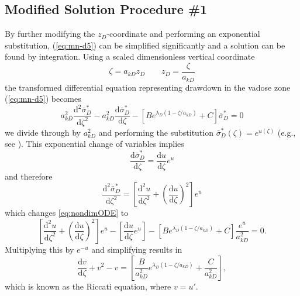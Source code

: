 \documentclass[12pt,letterpaper]{article}
\begin{document}
\subsection{Modified Solution Procedure \#1} 
By further modifying the $z_D$-coordinate and performing an exponential substitution, (\ref{eq:mn-d5}) can be simplified significantly and a solution can be found by integration.  Using a scaled dimensionless vertical coordinate 
\begin{equation}\nonumber
 \zeta= a_{kD} z_D \qquad z_D=\frac{\zeta}{a_{kD}} 
\end{equation}
the transformed differential equation representing drawdown in the vadose zone (\ref{eq:mn-d5}) becomes
\begin{equation}
  \label{eq:nondimODE}
  a_{kD}^2 \frac{\mathrm{d}^2
    \bar{\sigma}_D^{\ast}}{\mathrm{d}\zeta^2} - a_{kD}^2
  \frac{\mathrm{d} \bar{\sigma}_D^{\ast}}{\mathrm{d}\zeta} - \left[
    B e^{\lambda_D (1-\zeta/a_{kD})} + C\right] \bar{\sigma}_D^{\ast}=0
\end{equation}
we divide through by $a_{kD}^2$ and performing the substitution
$\bar{\sigma}_D^{\ast}(\zeta)=e^{u(\zeta)}$ (e.g., see \cite[p.\ 27]{bender1978advanced}).  This exponential change of variables implies
\begin{equation}\nonumber
\frac{\mathrm{d}\bar{\sigma}_D^{\ast}}{\mathrm{d}\zeta} =
\frac{\mathrm{d}u}{\mathrm{d}\zeta}e^u
\end{equation} 
and therefore
\begin{equation}\nonumber
\frac{\mathrm{d}^2\bar{\sigma}_D^{\ast}}{\mathrm{d}\zeta^2} =
\left[ \frac{\mathrm{d}^2u}{\mathrm{d}\zeta^2} +
\left(\frac{\mathrm{d}u}{\mathrm{d}\zeta}\right)^2 \right]e^u
\end{equation}
which changes \eqref{eq:nondimODE} to
\begin{equation}\nonumber
 \left[ \frac{\mathrm{d}^2u}{\mathrm{d}\zeta^2} +
  \left(\frac{\mathrm{d}u}{\mathrm{d}\zeta}\right)^2 \right]e^u -  \left[
  \frac{\mathrm{d}u}{\mathrm{d}\zeta}e^u \right]- \left[ B e^{\lambda_D (1-\zeta/a_{kD})} + C\right] \frac{e^{u}}{a_{kD}^2} =0.
\end{equation}
Multiplying this by $e^{-u}$ and simplifying results in
\begin{equation}
  \label{eq:expsubODE}
   \frac{\mathrm{d} v}{\mathrm{d}\zeta} +v^2 - v = \left[ \frac{B}{a_{kD}^2} e^{\lambda_D (1-\zeta/a_{kD})} + \frac{C}{a_{kD}^2}\right],
\end{equation}
which is known as the Riccati equation, where $v=u'$.
\end{document}
